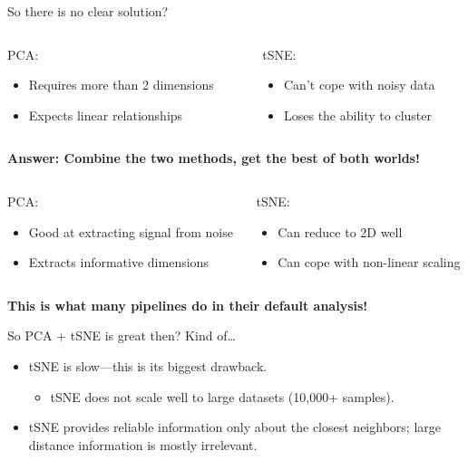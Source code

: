 \begin{frame}[allowframebreaks]{So there is no clear solution?}
    \begin{columns}
    \begin{column}{0.5\textwidth}
        PCA:
        \begin{itemize}
            \item Requires more than 2 dimensions
            \item Expects linear relationships
        \end{itemize}
    \end{column}
    \begin{column}{0.5\textwidth}
        tSNE:
        \begin{itemize}
            \item Can’t cope with noisy data
            \item Loses the ability to cluster
        \end{itemize}
    \end{column}
    \end{columns}
    \vspace{1em}
    \textbf{Answer: Combine the two methods, get the best of both worlds!}
    \vspace{1em}
    \begin{columns}
    \begin{column}{0.5\textwidth}
        PCA:
        \begin{itemize}
            \item Good at extracting signal from noise
            \item Extracts informative dimensions
        \end{itemize}
    \end{column}
    \begin{column}{0.5\textwidth}
        tSNE:
        \begin{itemize}
            \item Can reduce to 2D well
            \item Can cope with non-linear scaling
        \end{itemize}
    \end{column}
    \end{columns}
    \vspace{1em}
    \textbf{This is what many pipelines do in their default analysis!}

\end{frame}

\begin{frame}[allowframebreaks]{So PCA + tSNE is great then?}
    Kind of\dots
    \begin{itemize}
        \item tSNE is slow—this is its biggest drawback.
        \begin{itemize}
            \item tSNE does not scale well to large datasets (10,000+ samples).
        \end{itemize}
        \item tSNE provides reliable information only about the closest neighbors; large distance information is mostly irrelevant.
    \end{itemize}
\end{frame}